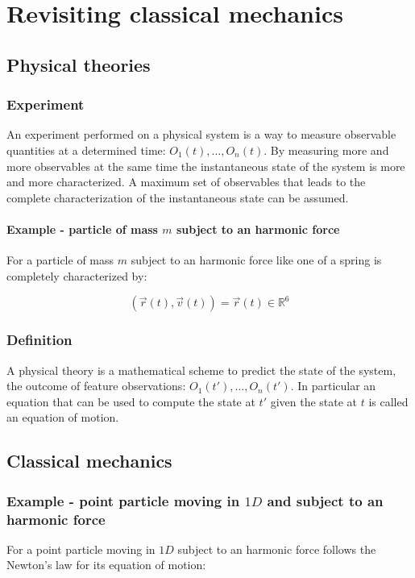\chapter{Revisiting classical mechanics}

\section{Physical theories}

  \subsection{Experiment}
  An experiment performed on a physical system is a way to measure observable quantities at a determined time: $O_1(t), \dots, O_n(t)$.
  By measuring more and more observables at the same time the instantaneous state of the system is more and more characterized.
  A maximum set of observables that leads to the complete characterization of the instantaneous state can be assumed.

    \subsubsection{Example - particle of mass $m$ subject to an harmonic force}
    For a particle of mass $m$ subject to an harmonic force like one of a spring is completely characterized by: 
    
    $$(\vec{r}(t),\vec{v}(t))=\vec{r}(t)\in \mathbb{R}^6$$

  \subsection{Definition}
  A physical theory is a mathematical scheme to predict the state of the system, the outcome of feature observations: $O_1(t'), \dots, O_n(t')$.
  In particular an equation that can be used to compute the state at $t'$ given the state at $t$ is called an equation of motion.

\section{Classical mechanics}

  \subsection{Example - point particle moving in $1D$ and subject to an harmonic force}
  For a point particle moving in $1D$ subject to an harmonic force follows the Newton's law for its equation of motion:

